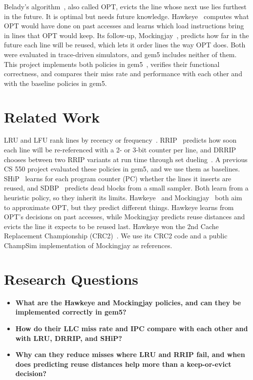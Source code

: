 \documentclass[10pt,journal,compsoc]{IEEEtran}
\begin{document}
Belady's algorithm~\cite{belady}, also called OPT, evicts the line whose next
use lies furthest in the future. It is optimal but needs future knowledge.
Hawkeye~\cite{hawkeye} computes what OPT would have done on past accesses and
learns which load instructions bring in lines that OPT would keep. Its
follow-up, Mockingjay~\cite{mockingjay}, predicts how far in the future each
line will be reused, which lets it order lines the way OPT does. Both were
evaluated in trace-driven simulators, and gem5 includes neither of them.
This project implements both policies in gem5~\cite{gem5,gem5v20}, verifies
their functional correctness, and compares their miss rate and performance with
each other and with the baseline policies in gem5.

\section{Related Work}

LRU and LFU rank lines by recency or frequency~\cite{hp6}. RRIP~\cite{rrip}
predicts how soon each line will be re-referenced with a 2- or 3-bit counter per
line, and DRRIP chooses between two RRIP variants at run time through set
dueling~\cite{dip}. A previous CS 550 project evaluated these policies in gem5,
and we use them as baselines. SHiP~\cite{ship} learns for each program counter
(PC) whether the lines it inserts are reused, and SDBP~\cite{sdbp} predicts
dead blocks from a small sampler. Both learn from a heuristic policy, so they
inherit its limits. Hawkeye~\cite{hawkeye} and Mockingjay~\cite{mockingjay}
both aim to approximate OPT, but they predict different things. Hawkeye learns
from OPT's decisions on past accesses, while Mockingjay predicts reuse
distances and evicts the line it expects to be reused last. Hawkeye won the 2nd Cache Replacement
Championship (CRC2)~\cite{crc2}. We use its CRC2 code and a public ChampSim
implementation of Mockingjay as references.

\section{Research Questions}

\begin{itemize}
\item \textbf{What are the Hawkeye and Mockingjay policies, and can they be
implemented correctly in gem5?}
\item \textbf{How do their LLC miss rate and IPC compare with each other and
with LRU, DRRIP, and SHiP?}
\item \textbf{Why can they reduce misses where LRU and RRIP fail, and when does
predicting reuse distances help more than a keep-or-evict decision?}
\end{itemize}
\end{document}
